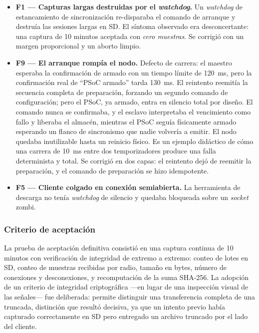\begin{itemize}[itemsep=0.25em]
    \item \textbf{F1 --- Capturas largas destruidas por el \emph{watchdog}.} Un
    \emph{watchdog} de estancamiento de sincronizaci\'on re-disparaba el comando de arranque
    y destru\'ia las sesiones largas en SD. El s\'intoma observado era desconcertante: una
    captura de 10 minutos aceptada con \emph{cero muestras}. Se corrigi\'o con un margen
    proporcional y un aborto limpio.
    \item \textbf{F9 --- El arranque romp\'ia el nodo.} Defecto de carrera:
    el maestro esperaba la confirmaci\'on de armado con un tiempo l\'imite de
    \SI{120}{\milli\second}, pero la confirmaci\'on real de ``PSoC armado'' tarda
    \SI{130}{\milli\second}. El reintento reemit\'ia la secuencia completa de preparaci\'on,
    forzando un segundo comando de configuraci\'on; pero el PSoC, ya armado, entra en
    silencio total por dise\~no. El comando nunca se confirmaba, y el esclavo interpretaba
    el vencimiento como fallo y liberaba el almac\'en, mientras el PSoC segu\'ia f\'isicamente
    armado esperando un flanco de sincronismo que nadie volver\'ia a emitir. El nodo quedaba
    inutilizable hasta un reinicio f\'isico. Es un ejemplo did\'actico de c\'omo una carrera
    de \SI{10}{\milli\second} entre dos temporizadores produce una falla determinista y
    total. Se corrigi\'o en dos capas: el reintento dej\'o de reemitir la preparaci\'on, y el
    comando de preparaci\'on se hizo idempotente.
    \item \textbf{F5 --- Cliente colgado en conexi\'on semiabierta.} La herramienta de
    descarga no ten\'ia \emph{watchdog} de silencio y quedaba bloqueada sobre un
    \emph{socket} zombi.
\end{itemize}

\subsubsection{Criterio de aceptaci\'on}

La prueba de aceptaci\'on definitiva consisti\'o en una captura continua de 10 minutos con
verificaci\'on de integridad de extremo a extremo: conteo de lotes en SD, conteo de
muestras recibidas por radio, tama\~no en bytes, n\'umero de conexiones y desconexiones, y
recomputaci\'on de la suma SHA-256. La adopci\'on de un criterio de integridad
criptogr\'afica ---en lugar de una inspecci\'on visual de las se\~nales--- fue deliberada:
permite distinguir una transferencia completa de una truncada, distinci\'on que result\'o
decisiva, ya que un intento previo hab\'ia capturado correctamente en SD pero entregado un
archivo truncado por el lado del cliente.

